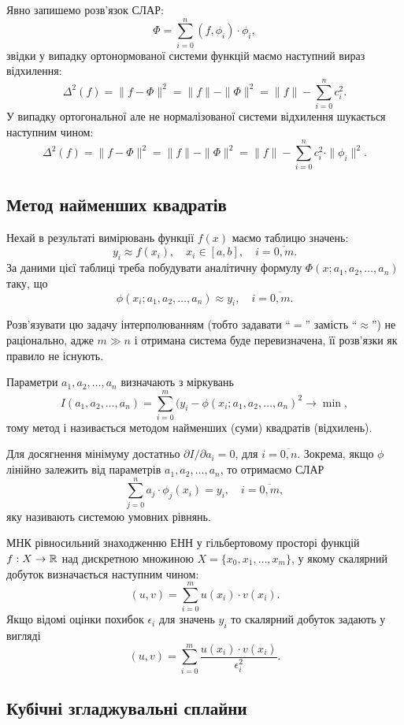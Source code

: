 Явно запишемо розв'язок СЛАР: \[ \Phi = \sum_{i = 0}^n (f, \phi_i) \cdot \phi_i, \] звідки у випадку ортонормованої системи функцій маємо наступний вираз відхилення: \[ \Delta^2(f) = \|f - \Phi\|^2 = \|f\| - \|\Phi\|^2 = \|f\| - \sum_{i=0}^n c_i^2.\] У випадку ортогональної але не нормалізованої системи відхилення шукається наступним чином: \[ \Delta^2(f) = \|f - \Phi\|^2 = \|f\| - \|\Phi\|^2 = \|f\| - \sum_{i=0}^n c_i^2 \cdot \|\phi_i\|^2.\]

\subsection{Метод найменших квадратів}

Нехай в результаті вимірювань функції $f(x)$ маємо таблицю значень: \[ y_i \approx f(x_i), \quad x_i \in [a, b], \quad i = \overline{0, m}.\] За даними цієї таблиці треба побудувати аналітичну формулу $\Phi(x; a_1, a_2, \ldots, a_n)$ таку, що \[ \phi(x_i; a_1, a_2, \ldots, a_n) \approx y_i, \quad i = \overline{0, m}.\] 

Розв'язувати цю задачу інтерполюванням (тобто задавати ``$=$'' замість ``$\approx$'') не раціонально, адже $m \gg n$ і отримана система буде перевизначена, її розв'язки як правило не існують. \medskip

Параметри $a_1, a_2, \ldots, a_n$ визначають з міркувань \[I(a_1, a_2, \ldots, a_n) = \sum_{i = 0}^m (y_i - \phi(x_i; a_1, a_2, \ldots, a_n)^2 \to \min,\] тому метод і називається методом найменших (суми) квадратів (відхилень). \medskip

Для досягнення мінімуму достатньо $\partial I / \partial a_i = 0$, для $i = \overline{0, n}$. Зокрема, якщо $\phi$ лінійно залежить від параметрів $a_1, a_2, \ldots, a_n$, то отримаємо СЛАР \[ \sum_{j = 0}^n a_j \cdot \phi_j(x_i) = y_i, \quad i = \overline{0, m},\] яку називають системою умовних рівнянь. \medskip

МНК рівносильний знаходженню ЕНН у гільбертовому просторі функцій $f: X \to \mathbb{R}$ над дискретною множиною $X = \{x_0, x_1, \ldots, x_m\}$, у якому скалярний добуток визначається наступним чином: \[ (u, v) = \sum_{i = 0}^m u(x_i) \cdot v(x_i). \] Якщо відомі оцінки похибок $\epsilon_i$ для значень $y_i$ то скалярний добуток задають у вигляді \[ (u, v) = \sum_{i = 0}^m \frac{u(x_i) \cdot v(x_i)}{\epsilon_i^2}. \]

\subsection{Кубічні згладжувальні сплайни}

